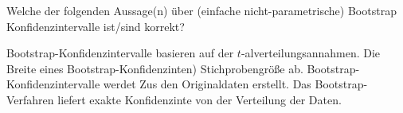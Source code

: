 \documentclass[10pt,addpoints]{exam}
\begin{document}
\begin{questions}
\question Welche der folgenden Aussage(n) über (einfache nicht-parametrische) Bootstrap Konfidenzintervalle ist/sind korrekt?\\

\begin{choices}
\choice Bootstrap-Konfidenzintervalle basieren auf der $t$-alverteilungsannahmen.
\choice Die Breite eines Bootstrap-Konfidenzinten) Stichprobengröße ab.
\CorrectChoice Bootstrap-Konfidenzintervalle werdet Zus den Originaldaten erstellt.
\choice Das Bootstrap-Verfahren liefert exakte Konfidenzinte von der Verteilung der Daten.
\end{choices}



\printanswers
\end{questions}
\end{document}
